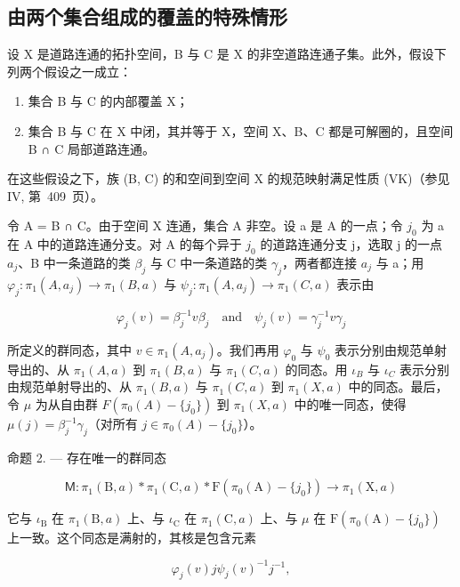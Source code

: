 \subsection{由两个集合组成的覆盖的特殊情形}

设 X 是道路连通的拓扑空间，B 与 C 是 X 的非空道路连通子集。此外，假设下列两个假设之一成立：

\begin{enumerate}
\def\labelenumi{(\roman{enumi})}
\item
  集合 B 与 C 的内部覆盖 X；
\item
  集合 B 与 C 在 X 中闭，其并等于 X，空间 X、B、C 都是可解圈的，且空间 B ∩ C 局部道路连通。
\end{enumerate}

在这些假设之下，族 (B, C) 的和空间到空间 X 的规范映射满足性质 (VK)（参见 IV, 第~409~页）。

令 A = B ∩ C。由于空间 X 连通，集合 A 非空。设 a 是 A 的一点；令 \(j_{0}\) 为 a 在 A 中的道路连通分支。对 A 的每个异于 \(j_{0}\) 的道路连通分支 j，选取 j 的一点 \(a_{j}\)、B 中一条道路的类 \(\beta_{j}\) 与 C 中一条道路的类 \(\gamma_{j}\)，两者都连接 \(a_{j}\) 与 a；用 \(\varphi_{j}\colon\pi_{1}(A,a_{j})\to\pi_{1}(B,a)\) 与 \(\psi_{j}\colon\pi_{1}(A,a_{j})\to\pi_{1}(C,a)\) 表示由

\[
\varphi_ {j} (v) = \beta_ {j} ^ {- 1} v \beta_ {j} \quad \text {and} \quad \psi_ {j} (v) = \gamma_ {j} ^ {- 1} v \gamma_ {j}
\]

所定义的群同态，其中 \(v \in \pi_1(A, a_j)\)。我们再用 \(\varphi_0\) 与 \(\psi_0\) 表示分别由规范单射导出的、从 \(\pi_1(A, a)\) 到 \(\pi_1(B, a)\) 与 \(\pi_1(C, a)\) 的同态。用 \(\iota_B\) 与 \(\iota_C\) 表示分别由规范单射导出的、从 \(\pi_1(B, a)\) 与 \(\pi_1(C, a)\) 到 \(\pi_1(X, a)\) 中的同态。最后，令 \(\mu\) 为从自由群 \(F(\pi_0(A) - \{j_0\})\) 到 \(\pi_1(X, a)\) 中的唯一同态，使得 \(\mu(j) = \beta_j^{-1}\gamma_j\)（对所有 \(j \in \pi_0(A) - \{j_0\}\)）。

命题 2. --- 存在唯一的群同态

\[
\mathsf {M} \colon \pi_ {1} (\mathrm{B}, a) * \pi_ {1} (\mathrm{C}, a) * \mathrm{F} (\pi_ {0} (\mathrm{A}) - \{j _ {0} \}) \to \pi_ {1} (\mathrm{X}, a)
\]

它与 \(\iota_{\mathrm{B}}\) 在 \(\pi_1(\mathrm{B},a)\) 上、与 \(\iota_{\mathrm{C}}\) 在 \(\pi_1(\mathrm{C},a)\) 上、与 \(\mu\) 在 \(\mathrm{F}(\pi_0(\mathrm{A}) - \{j_0\})\) 上一致。这个同态是满射的，其核是包含元素

\[
\varphi_ {j} (v) j \psi_ {j} (v) ^ {- 1} j ^ {- 1},
\]

